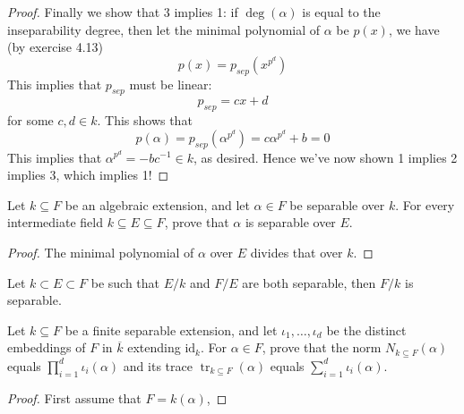 \documentclass[openany]{book}
\begin{document}
\begin{proof}
        Finally we show that 3 implies 1: if $\deg(\alpha)$ is equal to the inseparability degree, then let the minimal polynomial of $\alpha$ be $p(x)$, we have (by exercise 4.13)
        \begin{equation*}
            p(x)=p_{sep}(x^{p^d})
        \end{equation*}
        This implies that $p_{sep}$ must be linear: 
        \begin{equation*}
            p_{sep}=cx+d
        \end{equation*}
        for some $c,d\in k$. This shows that 
        \begin{equation*}
            p(\alpha)=p_{sep}(\alpha^{p^d})=c\alpha^{p^d}+b=0
        \end{equation*}
        This implies that $\alpha^{p^d}=-bc^{-1}\in k$, as desired. Hence we've now shown 1 implies 2 implies 3, which implies 1!
    \end{proof}
    
    
    
    
    \begin{prob}
    Let \( k \subseteq F \) be an algebraic extension, and let \( \alpha \in F \) be separable over \( k \). For every intermediate field \( k \subseteq E \subseteq F \), prove that \( \alpha \) is separable over \( E \).
    \end{prob}
    \begin{proof}
        The minimal polynomial of $\alpha$ over $E$ divides that over $k$.
    \end{proof}
    
    
    \begin{prop}
        Let $k\subset E\subset F$ be such that $E/k$ and $F/E$ are both separable, then $F/k$ is separable.
    
    \end{prop}
    


    \begin{prob}[HW]
        Let \( k \subseteq F \) be a finite separable extension, and let \( \iota_1, \ldots, \iota_d \) be the distinct embeddings of \( F \) in \( \overline{k} \) extending \(\text{id}_k\). For \(\alpha \in F\), prove that the norm \( N_{k \subseteq F}(\alpha) \) equals \(\prod_{i=1}^d \iota_i(\alpha)\) and its trace \(\operatorname{tr}_{k \subseteq F}(\alpha)\) equals \(\sum_{i=1}^d \iota_i(\alpha)\).
        \end{prob}
\begin{proof}
    First assume that $F=k(\alpha)$, 
\end{proof}
        
\end{document}

